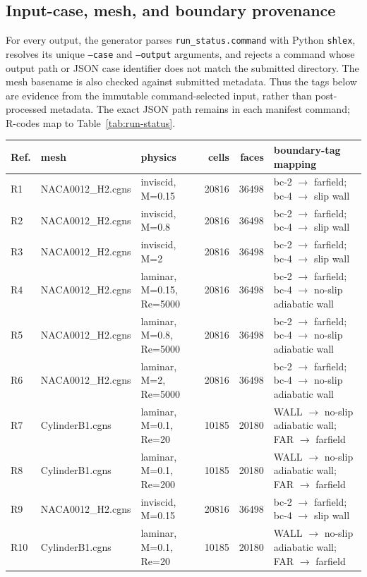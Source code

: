 \subsection{Input-case, mesh, and boundary provenance}
For every output, the generator parses \texttt{run\_status.command} with Python \texttt{shlex}, resolves its unique \texttt{--case} and \texttt{--output} arguments, and rejects a command whose output path or JSON case identifier does not match the submitted directory. The mesh basename is also checked against submitted metadata. Thus the tags below are evidence from the immutable command-selected input, rather than post-processed metadata. The exact JSON path remains in each manifest command; R-codes map to Table~\ref{tab:run-status}.
\begin{center}\small
\begin{tabular}{lllrrp{4.3cm}}
\toprule Ref. & mesh & physics & cells & faces & boundary-tag mapping\\
\midrule
R1 & NACA0012\_H2.cgns & inviscid, M=0.15 & 20816 & 36498 & bc-2 $\rightarrow$ farfield; bc-4 $\rightarrow$ slip wall\\
R2 & NACA0012\_H2.cgns & inviscid, M=0.8 & 20816 & 36498 & bc-2 $\rightarrow$ farfield; bc-4 $\rightarrow$ slip wall\\
R3 & NACA0012\_H2.cgns & inviscid, M=2 & 20816 & 36498 & bc-2 $\rightarrow$ farfield; bc-4 $\rightarrow$ slip wall\\
R4 & NACA0012\_H2.cgns & laminar, M=0.15, Re=5000 & 20816 & 36498 & bc-2 $\rightarrow$ farfield; bc-4 $\rightarrow$ no-slip adiabatic wall\\
R5 & NACA0012\_H2.cgns & laminar, M=0.8, Re=5000 & 20816 & 36498 & bc-2 $\rightarrow$ farfield; bc-4 $\rightarrow$ no-slip adiabatic wall\\
R6 & NACA0012\_H2.cgns & laminar, M=2, Re=5000 & 20816 & 36498 & bc-2 $\rightarrow$ farfield; bc-4 $\rightarrow$ no-slip adiabatic wall\\
R7 & CylinderB1.cgns & laminar, M=0.1, Re=20 & 10185 & 20180 & WALL $\rightarrow$ no-slip adiabatic wall; FAR $\rightarrow$ farfield\\
R8 & CylinderB1.cgns & laminar, M=0.1, Re=200 & 10185 & 20180 & WALL $\rightarrow$ no-slip adiabatic wall; FAR $\rightarrow$ farfield\\
R9 & NACA0012\_H2.cgns & inviscid, M=0.15 & 20816 & 36498 & bc-2 $\rightarrow$ farfield; bc-4 $\rightarrow$ slip wall\\
R10 & CylinderB1.cgns & laminar, M=0.1, Re=20 & 10185 & 20180 & WALL $\rightarrow$ no-slip adiabatic wall; FAR $\rightarrow$ farfield\\
\bottomrule
\end{tabular}
\label{tab:case-mesh-boundaries}
\end{center}
